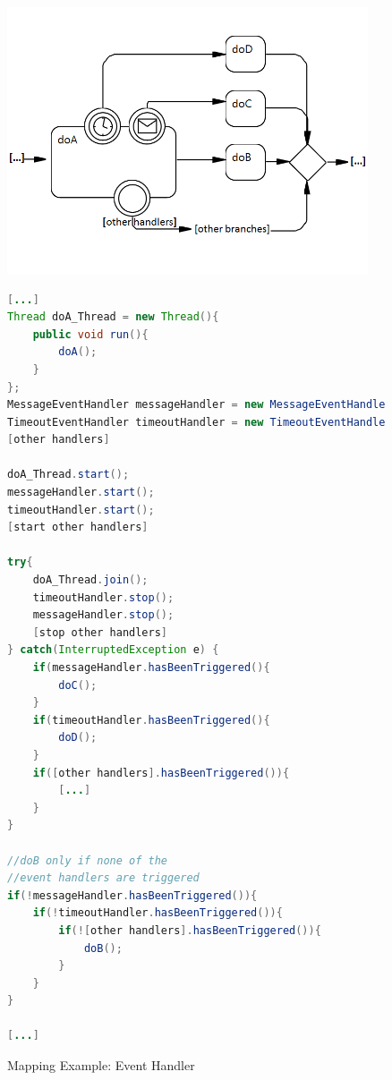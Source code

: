 \begin{figure}[h]
\begin{minipage}[c]{0.45\textwidth}
	\includegraphics[width=0.95\textwidth]{images/mapping/event_handler.png}
\end{minipage}
\begin{minipage}[c]{0.55\textwidth}
\begin{lstlisting}[language=Java]
[...]
Thread doA_Thread = new Thread(){
	public void run(){
		doA();
	}
};
MessageEventHandler messageHandler = new MessageEventHandler(doA_Thread);
TimeoutEventHandler timeoutHandler = new TimeoutEventHandler(20000, doA_Thread);
[other handlers]

doA_Thread.start();
messageHandler.start();
timeoutHandler.start();
[start other handlers]

try{
	doA_Thread.join();
	timeoutHandler.stop();
	messageHandler.stop();
	[stop other handlers]
} catch(InterruptedException e) {
	if(messageHandler.hasBeenTriggered(){
		doC();
	}
	if(timeoutHandler.hasBeenTriggered(){
		doD();
	}
	if([other handlers].hasBeenTriggered()){
		[...]
	}
}

//doB only if none of the 
//event handlers are triggered
if(!messageHandler.hasBeenTriggered()){
	if(!timeoutHandler.hasBeenTriggered()){
		if(![other handlers].hasBeenTriggered()){	
			doB(); 
		}
	}
}

[...]
\end{lstlisting}
\end{minipage}
\caption{Mapping Example: Event Handler}%
\label{fig:mapping_eventhandler}%
\end{figure}

